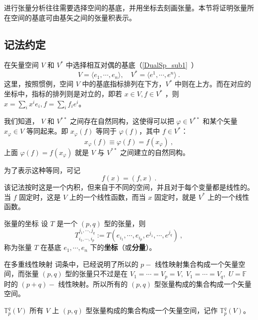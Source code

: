 
\begin{issues}
\issueDraft
\end{issues}

进行张量分析往往需要选择空间的基底，并用坐标去刻画张量。本节将证明张量所在空间的基底可由基矢之间的张量积表示。
\subsection{记法约定}
在矢量空间 $V$ 和 $V^*$ 中选择相互对偶的基底（\autoref{DualSp_sub1}~）
\begin{equation}
V=\langle e_1,\cdots ,e_n\rangle,\quad V^*=\langle e^1,\cdots,e^n\rangle~.
\end{equation}
这里，按照惯例，空间 $V$ 中的基底指标排列在下方，$V^*$ 中则在上方。而在对应的坐标中，指标的排列则是对立的，即若 $x\in V,f\in V^*$ ，则 $x=\sum_{i}x^i e_i,f=\sum_{i}f_ie^i$。

我们知道， $V$ 和 $V^{**}$ 之间存在自然同构，这使得可以把 $\varphi\in V^{**}$ 和某个矢量 $x_{\varphi}\in V$ 等同起来。即 $x_{\varphi}(f)$ 等同于 $\varphi(f)$，其中 $f\in V^*$：
\begin{equation}
x_{\varphi}(f)\equiv\varphi(f)=f(x_{\varphi})~,
\end{equation}
上面 $\varphi(f)=f(x_{\varphi})$ 就是 $V$ 与 $V^{**}$ 之间建立的自然同构。

为了表示这种等同，可记
\begin{equation}\label{CofTen_eq4}
f(x)=(f,x)~.
\end{equation}
该记法按时这是一个内积，但来自于不同的空间，并且对于每个变量都是线性的。当 $f$ 固定时，这是 $V$ 上的一个线性函数，而当 $x$ 固定时，就是 $V^{*}$ 上的一个线性函数。
\begin{definition}{张量的坐标}\label{CofTen_def2}
设 $T$ 是一个 $(p,q)$ 型的张量，则
\begin{equation}
T^{j_1,\cdots,j_q}_{i_1,\cdots,i_p}:=T(e_{i_1},\cdots,e_{i_p},e^{j_1},\cdots,e^{j_q})~,
\end{equation}
称为张量 $T$ 在基底 ${e_1,\cdots,e_n}$ 下的\textbf{坐标}（或\textbf{分量}）。
\end{definition}

在多重线性映射 词条中，已经说明了所以的 $p-$ 线性映射集合构成一个矢量空间，而张量 $(p,q)$ 型的张量只不过是在 $V_1=\cdots=V_p=V,\;V_1=\cdots=V_q,\;U=\mathbb F$ 时的 $(p+q)-$ 线性映射。所以所有的 $(p,q)$ 型张量构成的集合构成一个矢量空间。
\begin{definition}{$\mathbb T^q_p(V)$}\label{CofTen_def1}
所有 $V$ 上 $(p,q)$ 型张量构成的集合构成一个矢量空间，记作 $\mathbb T^q_p(V)$。
\end{definition} 
